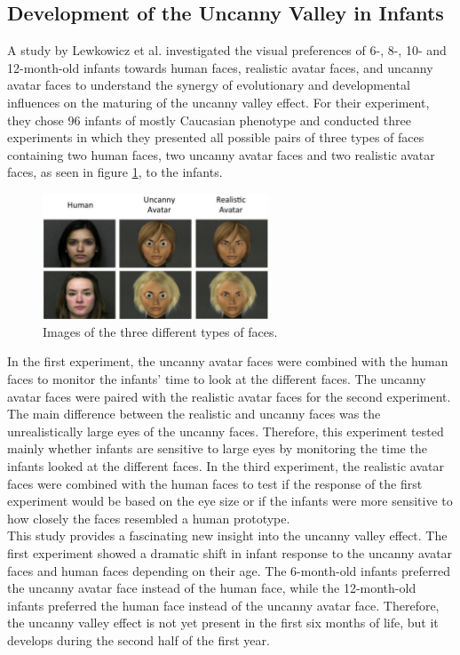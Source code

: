 \subsection{Development of the Uncanny Valley in Infants}
A study by Lewkowicz et al. \cite{uncanny_infants} investigated the visual preferences of 6-, 8-, 10- and 12-month-old infants towards human faces, realistic avatar faces, and uncanny avatar faces to understand the synergy of evolutionary and developmental influences on the maturing of the uncanny valley effect. For their experiment, they chose 96 infants of mostly Caucasian phenotype and conducted three experiments in which they presented all possible pairs of three types of faces containing two human faces, two uncanny avatar faces and two realistic avatar faces, as seen in figure \ref{fig:uncannyInfants}, to the infants. 
\begin{figure} %
    \centering
    \includegraphics[width=0.6\textwidth]{graphics/uncanny_infants.png}
    \caption{Images of the three different types of faces.}
    \label{fig:uncannyInfants}
\end{figure}
In the first experiment, the uncanny avatar faces were combined with the human faces to monitor the infants' time to look at the different faces. The uncanny avatar faces were paired with the realistic avatar faces for the second experiment. The main difference between the realistic and uncanny faces was the unrealistically large eyes of the uncanny faces. Therefore, this experiment tested mainly whether infants are sensitive to large eyes by monitoring the time the infants looked at the different faces. In the third experiment, the realistic avatar faces were combined with the human faces to test if the response of the first experiment would be based on the eye size or if the infants were more sensitive to how closely the faces resembled a human prototype.\\
This study provides a fascinating new insight into the uncanny valley effect. The first experiment showed a dramatic shift in infant response to the uncanny avatar faces and human faces depending on their age. The 6-month-old infants preferred the uncanny avatar face instead of the human face, while the 12-month-old infants preferred the human face instead of the uncanny avatar face. Therefore, the uncanny valley effect is not yet present in the first six months of life, but it develops during the second half of the first year.\\
